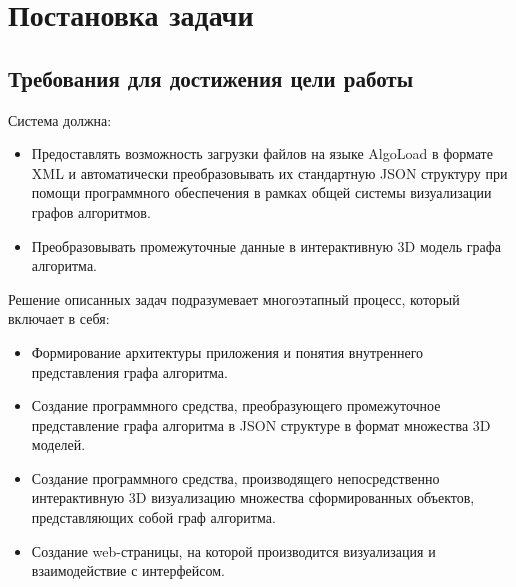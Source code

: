 \section{Постановка задачи}
\label{sec:Chapter1} 




\subsection{Требования для достижения цели работы}

Система должна:

\begin{itemize}
  \item Предоставлять возможность загрузки файлов на языке AlgoLoad в формате XML и автоматически преобразовывать их стандартную JSON структуру при помощи программного обеспечения в рамках общей системы визуализации графов алгоритмов.
  \item Преобразовывать промежуточные данные в интерактивную 3D модель графа алгоритма.
\end{itemize}

Решение описанных задач подразумевает многоэтапный процесс, который включает в себя:

\begin{itemize}
  \item Формирование архитектуры приложения и понятия внутреннего представления графа алгоритма. 
  \item Создание программного средства, преобразующего промежуточное представление графа алгоритма в JSON структуре в формат множества 3D моделей.
  \item Создание программного средства, производящего непосредственно интерактивную 3D визуализацию множества сформированных объектов, представляющих собой граф алгоритма. 
  \item Создание web-страницы, на которой производится визуализация и взаимодействие с интерфейсом.
\end{itemize}

